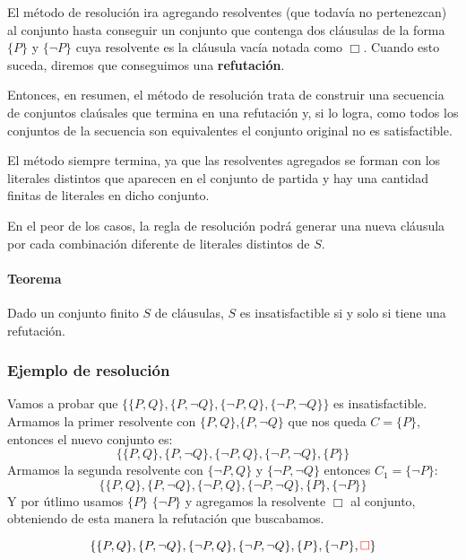 El método de resolución ira agregando resolventes (que todavía no pertenezcan) al conjunto hasta conseguir un conjunto que contenga dos cláusulas de la forma $\{P\}$ y $\{\lnot P\}$ cuya resolvente es la cláusula vacía notada como $\Box$. Cuando esto suceda, diremos que conseguimos una \textbf{refutación}.

Entonces, en resumen, el método de resolución trata de construir una secuencia de conjuntos claúsales que termina en una refutación y, si lo logra, como todos los conjuntos de la secuencia son equivalentes el conjunto original no es satisfactible.

El método siempre termina, ya que las resolventes agregados se forman con los literales distintos que aparecen en el conjunto de partida y hay una cantidad finitas de literales en dicho conjunto.

En el peor de los casos, la regla de resolución podrá generar una nueva cláusula por cada combinación diferente de literales distintos de $S$.

\paragraph{Teorema} Dado un conjunto finito $S$ de cláusulas, $S$ es insatisfactible si y solo si tiene una refutación. 

\subsubsection*{Ejemplo de resolución}

Vamos a probar que $\{ \{P,Q\},\{P,\lnot Q\},\{\lnot P, Q\},\{\lnot P, \lnot Q\}\}$ es insatisfactible. Armamos la primer resolvente con $\{P,Q\}$,$\{P,\lnot Q\}$ que nos queda $C = \{P\}$, entonces el nuevo conjunto es:
$$\{ \{P,Q\},\{P,\lnot Q\},\{\lnot P, Q\},\{\lnot P, \lnot Q\}, \{P\} \}$$
Armamos la segunda resolvente con $\{\lnot P, Q\}$ y $\{\lnot P, \lnot Q\}$ entonces $C_1 = \{\lnot P\}$:
$$\{ \{P,Q\},\{P,\lnot Q\},\{\lnot P, Q\},\{\lnot P, \lnot Q\}, \{P\}, \{\lnot P\} \}$$
Y por útlimo usamos $\{P\}$ $\{\lnot P\}$ y agregamos la resolvente $\Box$ al conjunto, obteniendo de esta manera la refutación que buscabamos.

$$\{ \{P,Q\},\{P,\lnot Q\},\{\lnot P, Q\},\{\lnot P, \lnot Q\}, \{P\}, \{\lnot P\}, {\color{red}\Box} \}$$

